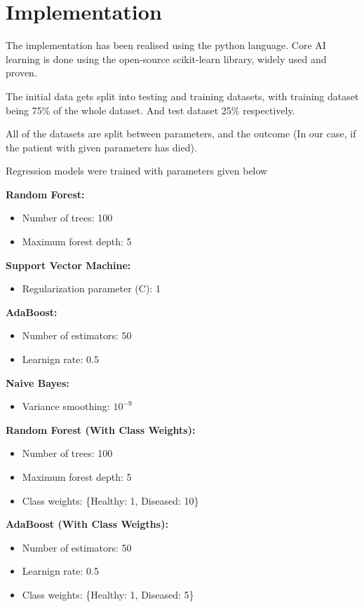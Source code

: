 \documentclass[conference]{IEEEtran}
\begin{document}
\section{Implementation}

The implementation has been realised using the python language. Core AI learning
is done using the open-source scikit-learn library, widely used and proven. 

The initial data gets split into testing and training datasets, with training
dataset being 75\% of the whole dataset. And test dataset 25\% respectively.

All of the datasets are split between parameters, and the outcome
(In our case, if the patient with given parameters has died).

Regression models were trained with parameters given below

\textbf{Random Forest:}
\begin{itemize}
    \item Number of trees: 100
    \item Maximum forest depth: 5
\end{itemize}

\textbf{Support Vector Machine:}
\begin{itemize}
    \item Regularization parameter (C): 1
\end{itemize}

\textbf{AdaBoost:}
\begin{itemize}
    \item Number of estimators: 50
    \item Learnign rate: 0.5
\end{itemize}

\textbf{Naive Bayes:}
\begin{itemize}
    \item Variance smoothing: $10^{-9}$
\end{itemize}

\textbf{Random Forest (With Class Weights):}
\begin{itemize}
    \item Number of trees: 100
    \item Maximum forest depth: 5
    \item Class weights: \{Healthy: 1, Diseased: 10\}
\end{itemize}

\textbf{AdaBoost (With Class Weigths):}
\begin{itemize}
    \item Number of estimators: 50
    \item Learnign rate: 0.5
    \item Class weights: \{Healthy: 1, Diseased: 5\}
\end{itemize}
\end{document}
